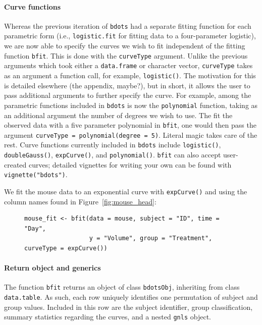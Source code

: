 \documentclass{article}
\newcommand{\xt}{\texttt}%
\begin{document}
\paragraph{Curve functions} Whereas the previous iteration of \xt{bdots} had a separate fitting function for each parametric form (i.e., \xt{logistic.fit} for fitting data to a four-parameter logistic), we are now able to specify the curves we wish to fit independent of the fitting function \xt{bfit}. This is done with the \xt{curveType} argument. Unlike the previous arguments which took either a \xt{data.frame} or character  vector, \xt{curveType} takes as an argument a function call, for example, \xt{logistic()}. The motivation for this is detailed elsewhere (the appendix, maybe?), but in short, it allows the user to pass additional arguments to further specify the curve. For example, among the parametric functions included in \xt{bdots} is now the \xt{polynomial} function, taking as an additional argument the number of degrees we wish to use. The fit the observed data with a five parameter polynomial in \xt{bfit}, one would then pass the argument \xt{curveType = polynomial(degree = 5)}. Literal magic takes care of the rest. Curve functions currently included in \xt{bdots} include \xt{logistic()}, \xt{doubleGauss()}, \xt{expCurve()}, and \xt{polynomial()}. \xt{bfit} can also accept user-created curves; detailed vignettes for writing your own can be found with \xt{vignette("bdots")}. 

We fit the mouse data to an exponential curve with \xt{expCurve()} and using the column names found in Figure~\ref{fig:mouse_head}:

\begin{singlespace}
\begin{figure}[H]
\centering
\begin{BVerbatim}
mouse_fit <- bfit(data = mouse, subject = "ID", time = "Day", 
                  y = "Volume", group = "Treatment", curveType = expCurve())
\end{BVerbatim}
\label{fig:bfit_example}
\end{figure}
\end{singlespace}


\paragraph{Return object and generics}


The function \texttt{bfit} returns an object of class \texttt{bdotsObj}, inheriting from class \texttt{data.table}. As such, each row uniquely identifies one permutation of subject and group values. Included in this row are the subject identifier, group classification, summary statistics regarding the curves, and a nested \xt{gnls} object. 
\end{document}
